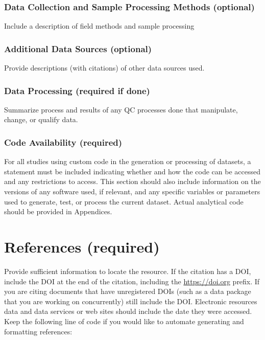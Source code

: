 \documentclass[
]{article}
\begin{document}
\hypertarget{data-collection-and-sample-processing-methods-optional}{%
\subsubsection{Data Collection and Sample Processing Methods
(optional)}\label{data-collection-and-sample-processing-methods-optional}}

Include a description of field methods and sample processing

\hypertarget{additional-data-sources-optional}{%
\subsubsection{Additional Data Sources
(optional)}\label{additional-data-sources-optional}}

Provide descriptions (with citations) of other data sources used.

\hypertarget{data-processing-required-if-done}{%
\subsubsection{Data Processing (required if
done)}\label{data-processing-required-if-done}}

Summarize process and results of any QC processes done that manipulate,
change, or qualify data.

\hypertarget{code-availability-required}{%
\subsubsection{Code Availability
(required)}\label{code-availability-required}}

For all studies using custom code in the generation or processing of
datasets, a statement must be included indicating whether and how the
code can be accessed and any restrictions to access. This section should
also include information on the versions of any software used, if
relevant, and any specific variables or parameters used to generate,
test, or process the current dataset. Actual analytical code should be
provided in Appendices.

\hypertarget{references-required}{%
\section{References (required)}\label{references-required}}

Provide sufficient information to locate the resource. If the citation
has a DOI, include the DOI at the end of the citation, including the
\url{https://doi.org} prefix. If you are citing documents that have
unregistered DOIs (such as a data package that you are working on
concurrently) still include the DOI. Electronic resources data and data
services or web sites should include the date they were accessed. Keep
the following line of code if you would like to automate generating and
formatting references:
\end{document}
